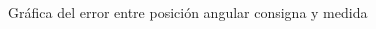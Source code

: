 \documentclass[a4paper, 10pt, onecolumn,journal]{ieeeconf}
\begin{document}
\begin{figure}[H]
	\centering
	\begin{adjustbox}{max width=\columnwidth}
	\end{adjustbox}
	\caption{Gráfica del error entre posición angular consigna y medida}
	\label{Grafica del error entre posicion angular consigna y medida }
\end{figure}
\end{document}

